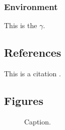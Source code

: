 \documentclass[]{interact}
\theoremstyle{plain}
\theoremstyle{definition}
\theoremstyle{remark}
\begin{document}
\subsubsection{Environment}
This is the ${\gamma}$.

\subsection{References}
This is a citation \citep{Ding_2022_CVPR}.

\subsection{Figures}
\begin{figure}
  \centering
  \hspace{5pt}
  \caption{Caption.} \label{sample-figure}
\end{figure}
\end{document}
